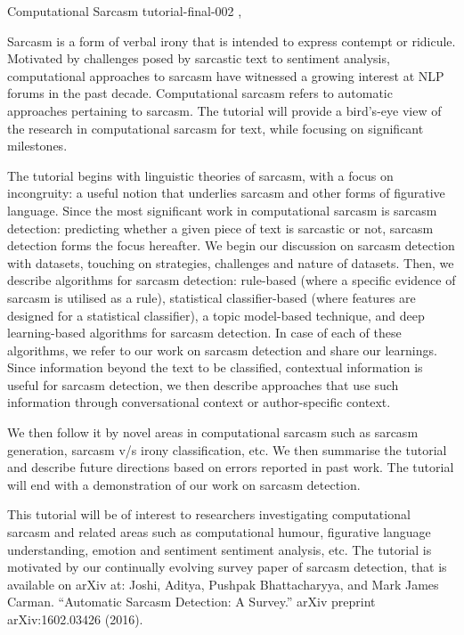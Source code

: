 \begin{tutorial}
  {Computational Sarcasm}
  {tutorial-final-002}
  {\daydateyear, \tutorialmorningtime}
  {\TutLocB}

Sarcasm is a form of verbal irony that is intended to express contempt or ridicule. Motivated by challenges posed by sarcastic text to sentiment analysis, computational approaches to sarcasm have witnessed a growing interest at NLP forums in the past decade. Computational sarcasm refers to automatic approaches pertaining to sarcasm. The tutorial will provide a bird’s-eye view of the research in computational sarcasm for text, while focusing on significant milestones.

The tutorial begins with linguistic theories of sarcasm, with a focus on incongruity: a useful notion that underlies sarcasm and other forms of figurative language. Since the most significant work in computational sarcasm is sarcasm detection: predicting whether a given piece of text is sarcastic or not, sarcasm detection forms the focus hereafter. We begin our discussion on sarcasm detection with datasets, touching on strategies, challenges and nature of datasets. Then, we describe algorithms for sarcasm detection: rule-based (where a specific evidence of sarcasm is utilised as a rule), statistical classifier-based (where features are designed for a statistical classifier), a topic model-based technique, and deep learning-based algorithms for sarcasm detection. In case of each of these algorithms, we refer to our work on sarcasm detection and share our learnings. Since information beyond the text to be classified, contextual information is useful for sarcasm detection, we then describe approaches that use such information through conversational context or author-specific context.

We then follow it by novel areas in computational sarcasm such as sarcasm generation, sarcasm v/s irony classification, etc. We then summarise the tutorial and describe future directions based on errors reported in past work. The tutorial will end with a demonstration of our work on sarcasm detection.

This tutorial will be of interest to researchers investigating computational sarcasm and related areas such as computational humour, figurative language understanding, emotion and sentiment sentiment analysis, etc. The tutorial is motivated by our continually evolving survey paper of sarcasm detection, that is available on arXiv at: Joshi, Aditya, Pushpak Bhattacharyya, and Mark James Carman. “Automatic Sarcasm Detection: A Survey.” arXiv preprint arXiv:1602.03426 (2016).

\end{tutorial}
